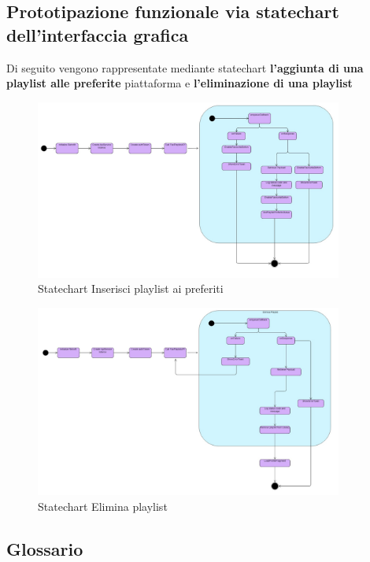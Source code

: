 \documentclass{article}
\begin{document}
		\subsection{Prototipazione funzionale via statechart dell’interfaccia grafica}
		Di seguito vengono rappresentate mediante statechart \textbf{l'aggiunta di una playlist alle preferite} piattaforma e \textbf{l'eliminazione di una playlist}
		\begin{figure}[H]
			\centering
			\includegraphics[width=0.9\textwidth]{Immagini/statechart1}
			\caption{Statechart Inserisci playlist ai preferiti}
		\end{figure}
		\begin{figure}[H]
			\centering
			\includegraphics[width=0.9\textwidth]{Immagini/statechart2}
			\caption{Statechart Elimina playlist}
		\end{figure}
		\subsection{Glossario}
\end{document}
